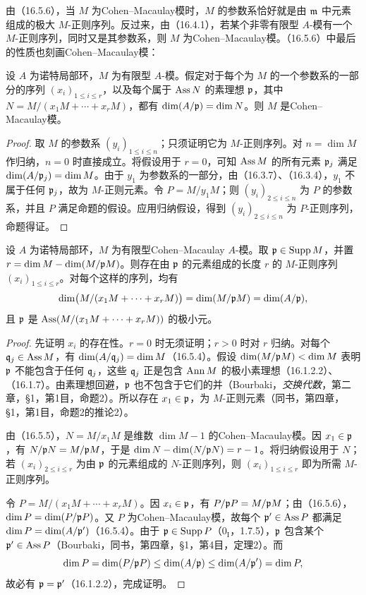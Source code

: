 由（16.5.6），当 $M$ 为Cohen--Macaulay模时，$M$ 的参数系恰好就是由 $\mathfrak m$ 中元素组成的极大 $M$-正则序列。反过来，由（16.4.1），若某个非零有限型 $A$-模有一个 $M$-正则序列，同时又是其参数系，则 $M$ 为Cohen--Macaulay模。（16.5.6）中最后的性质也刻画Cohen--Macaulay模：

设 $A$ 为诺特局部环，$M$ 为有限型 $A$-模。假定对于每个为 $M$ 的一个参数系的一部分的序列 $(x_i)_{1\leq i\leq r}$，以及每个属于
$\operatorname{Ass} N$ 的素理想 $\mathfrak p$，其中 $N=M/(x_1M+\cdots+x_rM)$，都有 $\dim(A/\mathfrak p)=\dim N$。则 $M$ 是Cohen--Macaulay模。
\begin{proof}
取 $M$ 的参数系 $(y_i)_{1\leq i\leq n}$；只须证明它为 $M$-正则序列。对 $n=\dim M$ 作归纳，$n=0$ 时直接成立。将假设用于 $r=0$，可知 $\operatorname{Ass} M$ 的所有元素 $\mathfrak p_j$ 满足 $\dim(A/\mathfrak p_j)=\dim M$。由于 $y_1$ 为参数系的一部分，由（16.3.7）、（16.3.4），$y_1$ 不属于任何 $\mathfrak p_j$，故为 $M$-正则元素。令 $P=M/y_1M$；则 $(y_i)_{2\leq i\leq n}$ 为 $P$ 的参数系，并且 $P$ 满足命题的假设。应用归纳假设，得到 $(y_i)_{2\leq i\leq n}$ 为 $P$-正则序列，命题得证。
\end{proof}

设 $A$ 为诺特局部环，$M$ 为有限型Cohen--Macaulay $A$-模。取 $\mathfrak p\in\operatorname{Supp} M$，并置 $r=\dim M-\dim(M/\mathfrak p M)$。则存在由 $\mathfrak p$ 的元素组成的长度 $r$ 的 $M$-正则序列 $(x_i)_{1\leq i\leq r}$。对每个这样的序列，均有
\[
 \dim\bigl(M/(x_1M+\cdots+x_rM)\bigr)
 =\dim(M/\mathfrak p M)=\dim(A/\mathfrak p),
\]
且 $\mathfrak p$ 是 $\operatorname{Ass}(M/(x_1M+\cdots+x_rM))$ 的极小元。
\begin{proof}
先证明 $x_i$ 的存在性。$r=0$ 时无须证明；$r>0$ 时对 $r$ 归纳。对每个 $\mathfrak q_j\in\operatorname{Ass} M$，有 $\dim(A/\mathfrak q_j)=\dim M$（16.5.4）。假设 $\dim(M/\mathfrak p M)<\dim M$ 表明 $\mathfrak p$ 不能包含于任何 $\mathfrak q_j$，这些 $\mathfrak q_j$ 正是包含 $\operatorname{Ann} M$ 的极小素理想（16.1.2.2）、（16.1.7）。由素理想回避，$\mathfrak p$ 也不包含于它们的并（Bourbaki，\textit{交换代数}，第二章，§1，第1目，命题2）。所以存在 $x_1\in\mathfrak p$，为 $M$-正则元素（同书，第四章，§1，第1目，命题2的推论2）。

由（16.5.5），$N=M/x_1M$ 是维数 $\dim M-1$ 的Cohen--Macaulay模。因 $x_1\in\mathfrak p$，有 $N/\mathfrak p N=M/\mathfrak p M$，于是
$\dim N-\dim(N/\mathfrak p N)=r-1$。将归纳假设用于 $N$；若 $(x_i)_{2\leq i\leq r}$ 为由 $\mathfrak p$ 的元素组成的 $N$-正则序列，则 $(x_i)_{1\leq i\leq r}$ 即为所需 $M$-正则序列。

令 $P=M/(x_1M+\cdots+x_rM)$。因 $x_i\in\mathfrak p$，有 $P/\mathfrak p P=M/\mathfrak p M$；由（16.5.6），$\dim P=\dim(P/\mathfrak p P)$。又 $P$ 为Cohen--Macaulay模，故每个 $\mathfrak p'\in\operatorname{Ass} P$ 都满足 $\dim P=\dim(A/\mathfrak p')$（16.5.4）。由于 $\mathfrak p\in\operatorname{Supp} P$（$0_{\mathrm I}$，1.7.5），$\mathfrak p$ 包含某个 $\mathfrak p'\in\operatorname{Ass} P$（Bourbaki，同书，第四章，§1，第4目，定理2）。而
\[
 \dim P=\dim(P/\mathfrak p P)\leq\dim(A/\mathfrak p)
 \leq\dim(A/\mathfrak p')=\dim P,
\]
故必有 $\mathfrak p=\mathfrak p'$（16.1.2.2），完成证明。
\end{proof}

